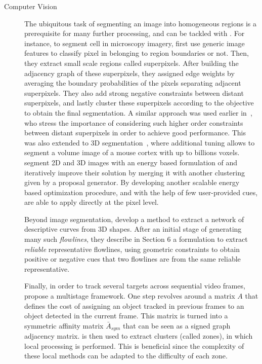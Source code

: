 \begin{description}
   \item[Computer Vision]
      The ubiquitous task of segmenting an image into homogeneous regions is a prerequisite for many
      further processing, and can be tackled with \pcc{}. For instance, to segment cell in
      microscopy imagery, \textcite{CellSeg14} first use generic image features to classify pixel in
      belonging to region boundaries or not. Then, they extract small scale regions called
      superpixels. After building the adjacency graph of these superpixels, they assigned edge
      weights by averaging the boundary probabilities of the pixels separating adjacent
      superpixels. They also add strong negative constraints between distant superpixels, and lastly
      cluster these superpixels according to the \pcc{} objective to obtain the final segmentation.
      A similar approach was used earlier in~\textcite{Kim2011}, who stress the importance of
      considering such higher order constraints between distant superpixels in order to achieve good
      performance. This was also extended to 3D segmentation~\autocite{VolumeSegmentation12}, where
      additional tuning allows to segment a volume image of a mouse cortex with up to billions
      voxels. \Textcite{Beier2015} segment 2D and 3D images with an energy based formulation of
      \pcc{} and iteratively improve their solution by merging it with another clustering given by a
      proposal generator. By developing another scalable energy based optimization procedure, and
      with the help of few user-provided cues, \textcite{Bagon2011} are able to apply \pcc{}
      directly at the pixel level.

      Beyond image segmentation, \textcite{Shape3D17} develop a method to extract a network of
      descriptive curves from 3D shapes.  After an initial stage of generating many such
      \emph{flowlines}, they describe in Section 6 a \pcc{} formulation to extract \emph{reliable}
      representative flowlines, using geometric constraints to obtain positive or negative cues that
      two flowlines are from the same reliable representative.

      Finally, in order to track several targets across sequential video frames,
      \textcite{multiTracking15} propose a multistage framework. One step revolves around a matrix
      $A$ that defines the cost of assigning an object tracked in previous frames to an object
      detected in the current frame. This matrix is turned into a symmetric affinity matrix
      $\bar{A}_{sym}$ that can be seen as a signed graph adjacency matrix. \pcc{} is then used to extract clusters
      (called zones), in which local processing is performed. This is beneficial since the
      complexity of these local methods can be adapted to the difficulty of each zone.


\end{description}
